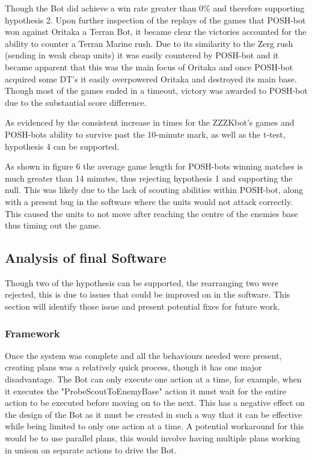 \documentclass[journal]{IEEEtran}
\begin{document}
	Though the Bot did achieve a win rate greater than 0\% and therefore supporting hypothesis 2. Upon further inspection of the replays of the games that POSH-bot won against Oritaka a Terran Bot, it became clear the victories accounted for the ability to counter a Terran Marine rush. Due to its similarity to the Zerg rush (sending in weak cheap units) it was easily countered by POSH-bot and it became apparent that this was the main focus of Oritaka and once POSH-bot acquired some DT's it easily overpowered Oritaka and destroyed its main base. Though most of the games ended in a timeout, victory was awarded to POSH-bot due to the substantial score difference.
	
	As evidenced by the consistent increase in times for the ZZZKbot's games and POSH-bots ability to survive past the 10-minute mark, as well as the t-test, hypothesis 4 can be supported. 
	
	As shown in figure 6 the average game length for POSH-bots winning matches is much greater than 14 minutes, thus rejecting hypothesis 1 and supporting the null. This was likely due to the lack of scouting abilities within POSH-bot, along with a present bug in the software where the units would not attack correctly. This caused the units to not move after reaching the centre of the enemies base thus timing out the game.
	
	\subsection{Analysis of final Software}
	Though two of the hypothesis can be supported, the rearranging two were rejected, this is due to issues that could be improved on in the software. This section will identify those issue and present potential fixes for future work.
	\newline
	
	\subsubsection{Framework}    
	Once the system was complete and all the behaviours needed were present, creating plans was a relatively quick process, though it has one major disadvantage. The Bot can only execute one action at a time, for example, when it executes the "ProbeScoutToEnemyBase" action it must wait for the entire action to be executed before moving on to the next. This has a negative effect on the design of the Bot as it must be created in such a way that it can be effective while being limited to only one action at a time. A potential workaround for this would be to use parallel plans, this would involve having multiple plans working in unison on separate actions to drive the Bot.    
	
\end{document}
